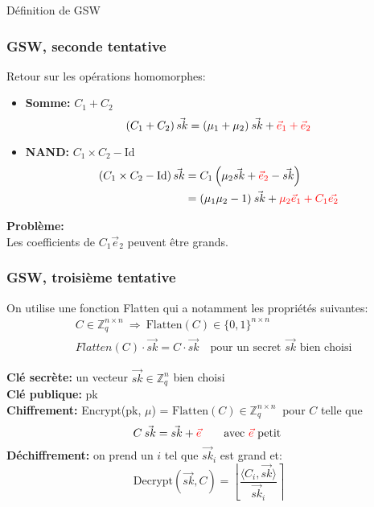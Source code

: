 \documentclass[10pt,xcolor={usenames,dvipsnames}]{beamer}
\newcommand{\ZZq}{\mathbb{Z}_q}
\begin{document}
\begin{section}{Définition de GSW}


\begin{frame} 
\frametitle{GSW, seconde tentative}
Retour sur les opérations homomorphes:
\begin{itemize}
\item \textbf{Somme:} $C_1 + C_2\quad$
\[\left(C_1 + C_2\right) \vec{sk} = (\mu_1 + \mu_2)\: \vec{sk} + {\color{red}\vec{e}_1 + \vec{e}_2}\]
\item \textbf{NAND:} $C_1 \times C_2 - \text{Id}$
\begin{align*}
\left(C_1 \times C_2 - \text{Id}\right) \vec{sk} &= C_1\left(\mu_2\vec{sk} + {\color{red}\vec{e}_2} - \vec{sk}\right) \\
&= (\mu_1 \mu_2 - 1)\: \vec{sk} + {\color{red}\mu_2 \vec{e}_1 + C_1 \vec{e_2}}
\end{align*}
\end{itemize}

\textbf{Problème:} \\
Les coefficients de $C_1 \vec{e}_2$ peuvent être grands.

\end{frame} 

  
\begin{frame} 
\frametitle{GSW, troisième tentative}
On utilise une fonction Flatten qui a notamment les propriétés suivantes:
\begin{align*}
&C \in \ZZq^{n \times n}\: \Longrightarrow \:\text{Flatten}(C) \in \{0,1\}^{n \times n} \\
& Flatten(C)\cdot \vec{sk} = C\cdot \vec{sk} \quad\text{pour un secret }\vec{sk}\text{ bien choisi}
\end{align*}

\textbf{Clé secrète:} un vecteur $\vec{sk} \in \ZZq^{n}$ bien choisi\\
\textbf{Clé publique:} pk\\
\textbf{Chiffrement:} Encrypt(pk, $\mu$) = $\text{Flatten}(C)\in \ZZq^{n \times n}\:$ pour $C$ telle que  
\[C \:\vec{sk} = \vec{sk} + {\color{red}\vec{e}}\qquad \text{avec }  {\color{red}\vec{e}} \text{ petit} \]
\textbf{Déchiffrement:} on prend un $i$ tel que $\vec{sk}_i$ est grand et:
\[\text{Decrypt}(\vec{sk}, C) = \left\lfloor \frac{\langle C_i, \vec{sk}\rangle}{\vec{sk}_i} \right\rceil \]


\end{frame}
\end{section}
\end{document}
